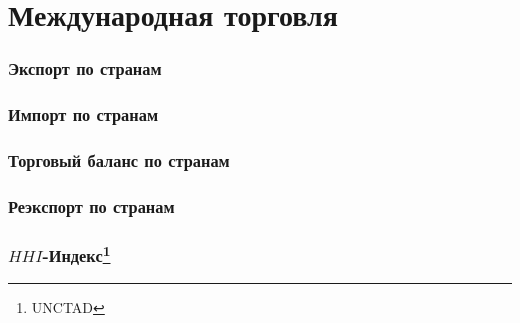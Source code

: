 \section{Международная торговля}

\begin{frame}
    \frametitle{Экспорт по странам}
    \begin{center}
        
    \end{center}
\end{frame}

\begin{frame}
    \frametitle{Импорт по странам}
    \begin{center}
        
    \end{center}
\end{frame}

\begin{frame}
    \frametitle{Торговый баланс по странам}
    \begin{center}
        
    \end{center}
\end{frame}

\begin{frame}
    \frametitle{Реэкспорт по странам}
    \begin{center}
        
    \end{center}
\end{frame}

\begin{frame}
    \frametitle{$HHI$-Индекс\footnote{UNCTAD}}
    \begin{center}
        
    \end{center}
\end{frame}